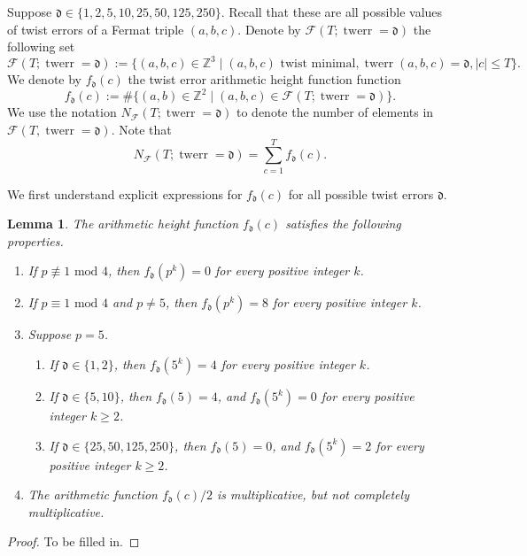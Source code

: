 \documentclass[12pt]{amsart}
\newcounter{counter}[section] %
\numberwithin{equation}{section} %
\newtheorem{lemma}[counter]{Lemma}
\theoremstyle{definition} \newtheorem{definition}[counter]{Definition}
\theoremstyle{remark} \newtheorem{nonexam}[counter]{Non-example}
\newcommand{\FF}{\mathscr{F}} %
\DeclareMathOperator{\twerr}{twerr} %
\begin{document}
Suppose $\mathfrak{d} \in \{1, 2, 5, 10, 25, 50, 125, 250\}$. Recall that these are all possible values of twist errors of a Fermat triple $(a,b,c)$. Denote by $\FF(T; \twerr = \mathfrak{d})$ the following set
\begin{equation*}
    \FF(T; \twerr = \mathfrak{d}) := \{(a,b,c) \in \mathbb{Z}^3 \; | \; (a,b,c) \text{ twist minimal}, \twerr(a,b,c) = \mathfrak{d}, |c| \leq T\}.
\end{equation*}
We denote by $f_{\mathfrak{d}}(c)$ the twist error arithmetic height function function
\begin{equation*}
    f_{\mathfrak{d}}(c) := \# \{(a,b) \in \mathbb{Z}^2 \; | \; (a,b,c) \in \FF(T; \twerr = \mathfrak{d})\}.
\end{equation*}
We use the notation $N_{\FF}(T; \twerr=\mathfrak{d})$ to denote the number of elements in $\FF(T, \twerr = \mathfrak{d})$. Note that
\begin{equation*}
    N_{\FF}(T; \twerr = \mathfrak{d}) = \sum_{c = 1}^T f_{\mathfrak{d}}(c).
\end{equation*}

We first understand explicit expressions for $f_{\mathfrak{d}}(c)$ for all possible twist errors $\mathfrak{d}$.
\begin{lemma}
    The arithmetic height function $f_{\mathfrak{d}}(c)$ satisfies the following properties.
    \begin{enumerate}
        \item If $p \not\equiv 1 \text{ mod } 4$, then $f_{\mathfrak{d}}(p^k) = 0$ for every positive integer $k$.
        \item If $p \equiv 1 \text{ mod } 4$ and $p \neq 5$, then $f_{\mathfrak{d}}(p^k) = 8$ for every positive integer $k$.
        \item Suppose $p = 5$. 
        \begin{enumerate}
            \item If $\mathfrak{d} \in \{1, 2\}$, then $f_{\mathfrak{d}}(5^k) = 4$ for every positive integer $k$.
            \item If $\mathfrak{d} \in \{5,10\}$, then $f_{\mathfrak{d}}(5) = 4$, and $f_{\mathfrak{d}}(5^k) = 0$ for every positive integer $k \geq 2$.
            \item If $\mathfrak{d} \in \{25,50,125,250\}$, then $f_{\mathfrak{d}}(5) = 0$, and $f_{\mathfrak{d}}(5^k) = 2$ for every positive integer $k \geq 2$.
        \end{enumerate}
        \item The arithmetic function $f_{\mathfrak{d}}(c)/2$ is multiplicative, but not completely multiplicative.
    \end{enumerate}
\end{lemma}
\begin{proof}
    To be filled in.
\end{proof}
\end{document}
